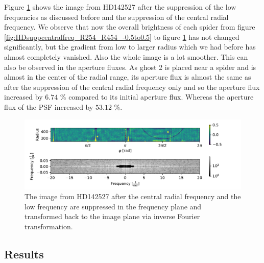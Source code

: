 Figure \ref{fig:HDsupplowfreq_R254_R454_-0.5to0.5.pdf} shows the image from HD142527 after the suppression of the low frequencies as discussed before and the suppression of the central radial frequency. We observe that now the overall brightness of each spider from figure \ref{fig:HDsuppcentralfreq_R254_R454_-0.5to0.5} to figure \ref{fig:HDsupplowfreq_R254_R454_-0.5to0.5.pdf} has not changed significantly, but the gradient from low to larger radius which we had before has almost completely vanished. Also the whole image is a lot smoother. This can also be observed in the aperture fluxes. As ghost 2 is placed near a spider and is almost in the center of the radial range, its aperture flux is almost the same as after the suppression of the central radial frequency only and so the aperture flux increased by $6.74$ \% compared to its initial aperture flux. Whereas the aperture flux of the PSF increased by $53.12$ \%. 
\begin{figure}[H]
	\centering
		\includegraphics[width=1.1\textwidth]{pics/HDsupplowfreq_R254_R454_-0.5to0.5.pdf}
		\caption{The image from HD142527 after the central radial frequency and the low frequency are suppressed in the frequency plane and transformed back to the image plane via inverse Fourier transformation.}
		\label{fig:HDsupplowfreq_R254_R454_-0.5to0.5.pdf}
\end{figure}

\subsection{Results}